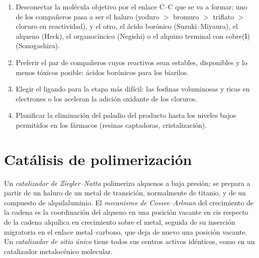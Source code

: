 \begin{method}\label{met:b3:homogeneous-catalysis:choose-coupling}
\begin{enumerate}
  \item Desconectar la molécula objetivo por el enlace C--C que se va a formar; uno de los compañeros pasa a ser el
        haluro (yoduro $>$ bromuro $>$ triflato $>$ cloruro en reactividad), y el otro, el
        ácido borónico (Suzuki--Miyaura), el alqueno (Heck), el organocíncico
        (Negishi) o el alquino terminal con cobre(I) (Sonogashira).
  \item Preferir el par de compañeros cuyos reactivos sean estables, disponibles y lo menos
        tóxicos posible: ácidos borónicos para los biarilos.
  \item Elegir el ligando para la etapa más difícil: las fosfinas voluminosas y ricas en electrones
        o los  aceleran la adición oxidante de los cloruros.
  \item Planificar la eliminación del paladio del producto hasta los niveles bajos
        permitidos en los fármacos (resinas captadoras, cristalización).
\end{enumerate}
\end{method}

\section{Catálisis de polimerización}

\begin{definition}\label{def:b3:homogeneous-catalysis:ziegler-natta}
Un \emph{catalizador de Ziegler--Natta} polimeriza
alquenos a baja presión; se prepara a partir de un haluro de un metal de transición, normalmente de
titanio, y de un compuesto de alquilaluminio. El \emph{mecanismo de
Cossee--Arlman} del crecimiento de la cadena es la coordinación
del alqueno en una posición vacante en cis respecto de la cadena alquílica en crecimiento sobre el metal,
seguida de su inserción migratoria en el enlace metal--carbono, que deja de nuevo una
posición vacante. Un \emph{catalizador de sitio único} tiene
todos sus centros activos idénticos, como en un catalizador metalocénico molecular.
\end{definition}

